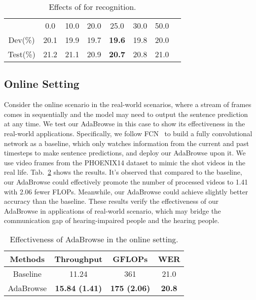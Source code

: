 \documentclass[sigconf]{acmart}
\begin{document}
  \begin{table}[t]   
    \centering      
    \caption{Effects of  for recognition.}
    \begin{tabular}{cccccccc}
    \hline
      & 0.0 & 10.0 & 20.0 & 25.0 & 30.0 & 50.0\\
    Dev(\%) & 20.1 & 19.9 &  19.7 & \textbf{19.6} & 19.8 & 20.0  \\
    Test(\%) & 21.2 & 21.1 & 20.9 & \textbf{20.7} & 20.8 & 21.0 \\
    \hline
    \end{tabular}
    \label{tab10}
    \vspace{-7px}
\end{table}

\subsection{Online Setting}
Consider the online scenario in the real-world scenarios, where a stream of frames comes in sequentially and the model may need to
output the sentence prediction at any time. We test our AdaBrowse in this case to show its effectiveness in the real-world applications. Specifically, we follow FCN~\cite{cheng2020fully} to build a fully convolutional network as a baseline, which only watches information from the current and past timesteps to make sentence predictions, and deploy our AdaBrowse upon it. We use video frames from the PHOENIX14 dataset to mimic the shot videos in the real life. Tab.~\ref{tab_online} shows the results. It's observed that compared to the baseline, our AdaBrowse could effectively promote the number of processed videos to 1.41 with 2.06 fewer FLOPs. Meanwhile, our AdaBrowse could achieve slightly better accuracy than the baseline. These results verify the effectiveness of our AdaBrowse in applications of real-world scenario, which may bridge the communication gap of hearing-impaired people and the hearing people.

\begin{table}[t]
  \setlength\tabcolsep{3pt}
  \caption{Effectiveness of AdaBrowse in the online setting. }
  \label{tab_online}
  \centering
  \begin{tabular}{cccc}
  \hline
  Methods  & Throughput & GFLOPs & WER  \\
  \hline
  Baseline	& 11.24	& 361	& 21.0	 \\
  AdaBrowse & \textbf{15.84 (1.41)} &  \textbf{175 (2.06)}      &\textbf{20.8} \\
\hline
\end{tabular}
\vspace{-7px}
\end{table}
\end{document}
